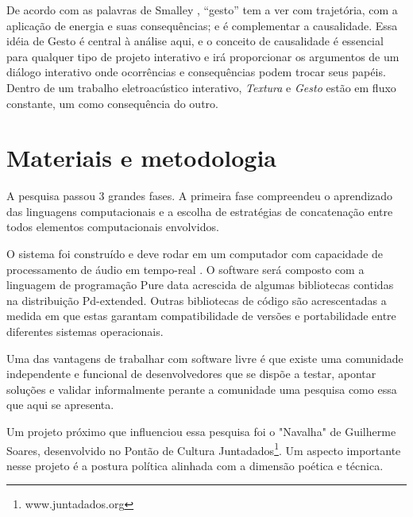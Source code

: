 \documentclass{ppgmus}
\begin{document}
De acordo com as palavras de Smalley \cite{emmersonsimon:86}, ``gesto'' tem a ver 
com trajetória, com a aplicação de energia e suas consequências; e é complementar
a causalidade. Essa idéia de Gesto é central à análise aqui, e o conceito de causalidade
é essencial para qualquer tipo de projeto interativo e irá proporcionar os argumentos
de um diálogo interativo onde ocorrências e consequências podem trocar seus papéis.
Dentro de um trabalho eletroacústico interativo, \textit{Textura} e \textit{Gesto} 
estão em fluxo constante, um como consequência do outro. 



\chapter{Materiais e metodologia}
\label{sec:metodologia}

A pesquisa passou 3 grandes fases.  A primeira fase
compreendeu o aprendizado das linguagens computacionais e a
escolha de estratégias de concatenação entre todos elementos
computacionais envolvidos. 

O sistema foi construído e deve rodar em um computador com capacidade de processamento
de áudio em tempo-real . O software será composto com
a linguagem de programação Pure data acrescida de algumas bibliotecas contidas
na distribuição Pd-extended. Outras bibliotecas de código são
acrescentadas a medida em que estas garantam compatibilidade de
versões e portabilidade entre diferentes sistemas operacionais.



Uma das vantagens de trabalhar com software livre é que existe uma
comunidade independente e funcional de desenvolvedores que se dispõe a
testar, apontar soluções e validar informalmente perante a comunidade
uma pesquisa como essa que aqui se apresenta.

Um projeto próximo que influenciou essa pesquisa foi o "Navalha"
de Guilherme Soares, desenvolvido no Pontão de Cultura Juntadados\footnote{www.juntadados.org}.
Um aspecto importante nesse projeto é a postura política alinhada com a dimensão
poética e técnica.
% 
\end{document}
